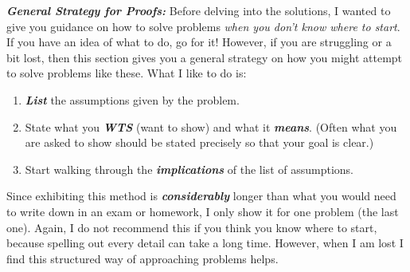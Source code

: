 \documentclass{article}
\begin{document}
\displayoptions

\textbf{\textit{General Strategy for Proofs:}} Before delving into the solutions, I wanted to give you guidance on how to solve problems \textit{when you don't know where to start}. If you have an idea of what to do, go for it! However, if you are struggling or a bit lost, then this  section gives you a general strategy on how you might attempt to solve problems like these. What I like to do is:
\begin{enumerate}
  \item \textbf{\textit{List}} the assumptions given by the problem.

  \item State what you \textbf{\textit{WTS}} (want to show) and what it \textit{\textbf{means}}. (Often what you are asked to show should be stated precisely so that your goal is clear.)

  \item Start walking through the \textit{\textbf{implications}} of the list of assumptions.
\end{enumerate}

Since exhibiting this method is \textit{\textbf{considerably}} longer than what you would need to write down in an exam or homework, I only show it for one problem (the last one).  Again, I do not recommend this if you think you know where to start, because spelling out every detail can take a long time. However, when I am lost I find this structured way of approaching problems helps.

\clearpage
\section{}
\end{document}
